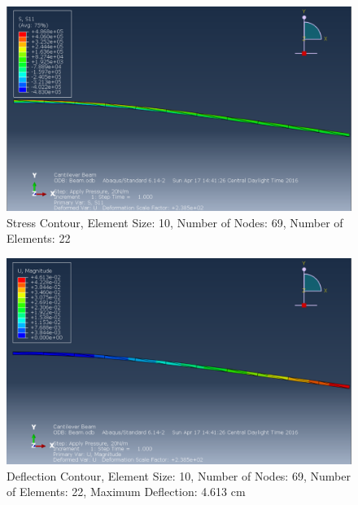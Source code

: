 \documentclass[a4paper]{article}
\begin{document}
\begin{figure}[ht]
\centering
\includegraphics[scale=.5]{6Nsize10Stress.PNG}
\caption{Stress Contour, Element Size: 10, Number of Nodes: 69, Number of Elements: 22}
\end{figure}
\begin{figure}[ht]
\centering
\includegraphics[scale=.5]{6Nsize10MDisplacement.PNG}
\caption{Deflection Contour, Element Size: 10, Number of Nodes: 69, Number of Elements: 22, Maximum Deflection: 4.613 cm}
\end{figure}
\end{document}
